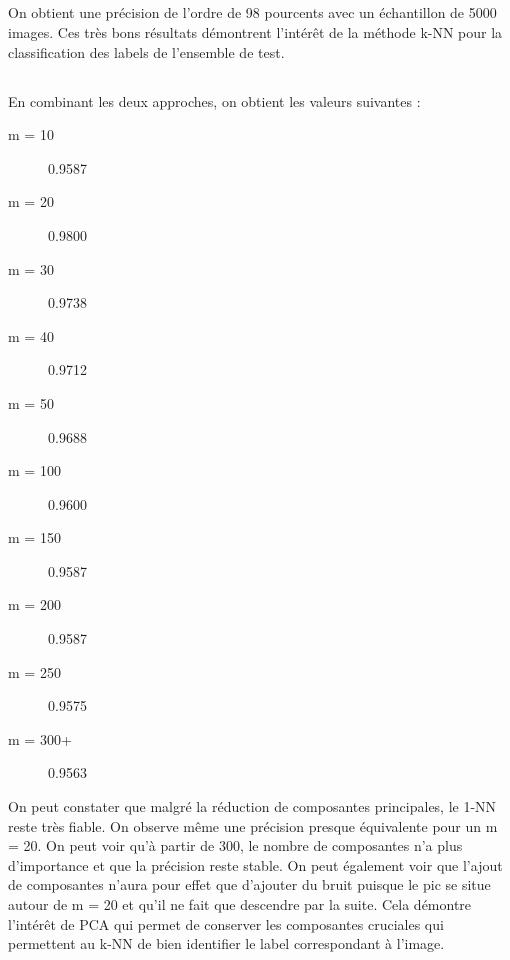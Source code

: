 \documentclass{article}
\begin{document}
	\subsection{}
	On obtient une précision de l'ordre de 98 pourcents avec un échantillon de 5000 images. Ces très bons résultats démontrent l'intérêt de la méthode k-NN pour la classification des labels de l'ensemble de test.
	
	\subsection{}
	En combinant les deux approches, on obtient les valeurs suivantes :
	\begin{description}
		\item[m =   10] 0.9587
		\item[m =   20] 0.9800
		\item[m =   30] 0.9738
		\item[m =   40] 0.9712
		\item[m =   50] 0.9688
		\item[m =  100] 0.9600
		\item[m =  150] 0.9587
		\item[m =  200] 0.9587
		\item[m =  250] 0.9575
		\item[m = 300+] 0.9563
	\end{description}
	On peut constater que malgré la réduction de composantes principales, le 1-NN reste très fiable. On observe même une précision presque équivalente pour un m = 20.
	On peut voir qu'à partir de 300, le nombre de composantes n'a plus d'importance et que la précision reste stable. On peut également voir que l'ajout de composantes n'aura pour effet que d'ajouter du bruit puisque le pic se situe autour de m = 20 et qu'il ne fait que descendre par la suite. Cela démontre l'intérêt de PCA qui permet de conserver les composantes cruciales qui permettent au k-NN de bien identifier le label correspondant à l'image.	
\end{document}
